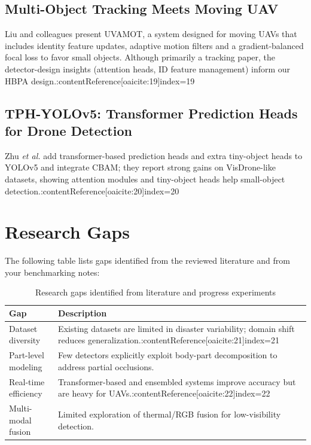 \documentclass[12pt,a4paper]{report}
\begin{document}
\subsection{Multi-Object Tracking Meets Moving UAV}
Liu and colleagues present UVAMOT, a system designed for moving UAVs that includes identity feature updates, adaptive motion filters and a gradient-balanced focal loss to favor small objects. Although primarily a tracking paper, the detector-design insights (attention heads, ID feature management) inform our HBPA design.:contentReference[oaicite:19]{index=19}

\subsection{TPH-YOLOv5: Transformer Prediction Heads for Drone Detection}
Zhu \textit{et al.} add transformer-based prediction heads and extra tiny-object heads to YOLOv5 and integrate CBAM; they report strong gains on VisDrone-like datasets, showing attention modules and tiny-object heads help small-object detection.:contentReference[oaicite:20]{index=20}

\section{Research Gaps}
The following table lists gaps identified from the reviewed literature and from your benchmarking notes:
\begin{table}[H]
\centering
\caption{Research gaps identified from literature and progress experiments}
\begin{tabular}{p{4cm} p{9cm}}
\hline
\textbf{Gap} & \textbf{Description} \\
\hline
Dataset diversity & Existing datasets are limited in disaster variability; domain shift reduces generalization.:contentReference[oaicite:21]{index=21} \\
Part-level modeling & Few detectors explicitly exploit body-part decomposition to address partial occlusions. \\
Real-time efficiency & Transformer-based and ensembled systems improve accuracy but are heavy for UAVs.:contentReference[oaicite:22]{index=22} \\
Multi-modal fusion & Limited exploration of thermal/RGB fusion for low-visibility detection. \\
\hline
\end{tabular}
\end{table}
\end{document}
